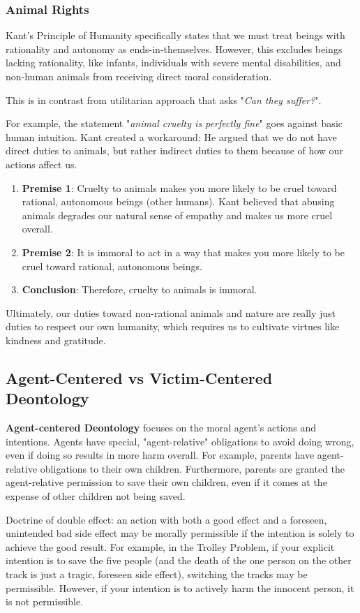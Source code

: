 \documentclass[12pt]{article}
\begin{document}
\subsubsection{Animal Rights}
Kant's Principle of Humanity specifically states that we must treat beings with rationality and autonomy as ends-in-themselves.
However, this excludes beings lacking rationality, like infants, individuals with severe mental disabilities, and non-human animals from receiving direct moral consideration.

\noindent This is in contrast from utilitarian approach that asks "\textit{Can they suffer?}".

\noindent For example, the statement "\textit{animal cruelty is perfectly fine}" goes against basic human intuition.
Kant created a workaround: He argued that we do not have direct duties to animals, but rather indirect duties to them because of how our actions affect us.
\begin{enumerate}
    \item \textbf{Premise 1}: Cruelty to animals makes you more likely to be cruel toward rational, autonomous beings (other humans). Kant believed that abusing animals degrades our natural sense of empathy and makes us more cruel overall.
    \item \textbf{Premise 2}: It is immoral to act in a way that makes you more likely to be cruel toward rational, autonomous beings.
    \item \textbf{Conclusion}: Therefore, cruelty to animals is immoral.
\end{enumerate}

\noindent Ultimately, our duties toward non-rational animals and nature are really just duties to respect our own humanity, which requires us to cultivate virtues like kindness and gratitude.

\subsection{Agent-Centered vs Victim-Centered Deontology}
\textbf{Agent-centered Deontology} focuses on the moral agent’s actions and intentions.
Agents have special, "agent-relative" obligations to avoid doing wrong, even if doing so results in more harm overall.
For example, parents have agent-relative obligations to their own children. Furthermore, parents are granted the agent-relative permission to save their own children, even if it comes at the expense of other children not being saved.

\noindent Doctrine of double effect: an action with both a good effect and a foreseen, unintended bad side effect may be morally permissible if the intention is solely to achieve the good result.
For example, in the Trolley Problem, if your explicit intention is to save the five people (and the death of the one person on the other track is just a tragic, foreseen side effect), switching the tracks may be permissible. 
However, if your intention is to actively harm the innocent person, it is not permissible.
\end{document}
